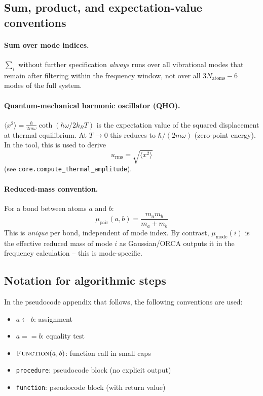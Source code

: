 \documentclass[11pt,a4paper,twoside]{article}
\theoremstyle{remark}
\begin{document}
\subsection{Sum, product, and expectation-value conventions}

\paragraph{Sum over mode indices.}
$\sum_i$ without further specification \emph{always} runs over all
vibrational modes that remain after filtering within the frequency
window, not over all $3N_\text{atoms} - 6$ modes of the full
system.

\paragraph{Quantum-mechanical harmonic oscillator (QHO).}
$\langle x^2 \rangle = \frac{\hbar}{2 m \omega}\coth(\hbar\omega/2k_BT)$
is the expectation value of the squared displacement at thermal
equilibrium. At $T \to 0$ this reduces to $\hbar/(2m\omega)$
(zero-point energy). In the tool, this is used to derive
\begin{equation}
  u_\text{rms} = \sqrt{\langle x^2\rangle}
\end{equation}
(see \texttt{core.compute\_thermal\_amplitude}).

\paragraph{Reduced-mass convention.}
For a bond between atoms $a$ and $b$:
\begin{equation}
  \mu_\text{pair}(a, b) = \frac{m_a m_b}{m_a + m_b}
\end{equation}
This is \emph{unique} per bond, independent of mode index. By
contrast, $\mu_\text{mode}(i)$ is the effective reduced mass of
mode $i$ as Gaussian/ORCA outputs it in the frequency calculation
-- this is mode-specific.

\subsection{Notation for algorithmic steps}

In the pseudocode appendix that follows, the following conventions
are used:

\begin{itemize}\setlength{\itemsep}{2pt}
  \item $a \gets b$: assignment
  \item $a == b$: equality test
  \item $\textsc{Function}(a, b)$: function call in small caps
  \item \texttt{procedure}: pseudocode block (no explicit output)
  \item \texttt{function}: pseudocode block (with return value)
\end{itemize}
\end{document}
